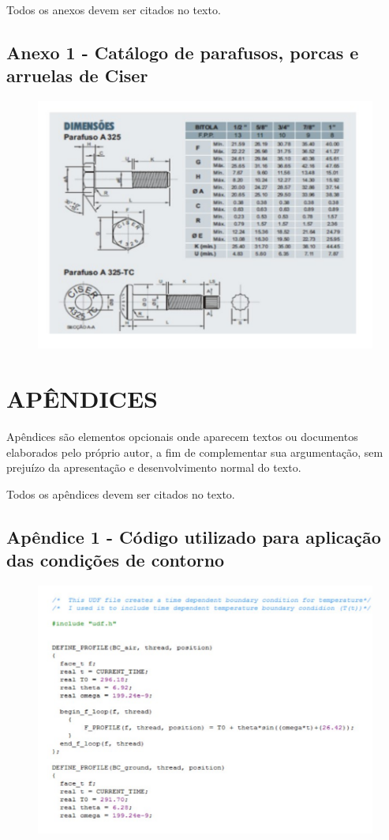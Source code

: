 \documentclass[a4paper,12pt,oneside]{article}
\numberwithin{equation}{section}
\begin{document}
Todos os anexos devem ser citados no texto.


\subsection{Anexo 1 - Catálogo de parafusos, porcas e arruelas de Ciser}
\begin{figure}[h]
\centering
\includegraphics[width=1\linewidth]{img/catalogo}
\end{figure}

\section{APÊNDICES}

Apêndices são elementos opcionais onde aparecem textos ou documentos elaborados pelo próprio autor, a fim de complementar sua argumentação, sem prejuízo da apresentação e
desenvolvimento normal do texto.


Todos os apêndices devem ser citados no texto.


\subsection{Apêndice 1 - Código utilizado para aplicação das condições de contorno}

\begin{figure}[h]
\centering
\includegraphics[width=1\linewidth]{img/codigo}
\end{figure}
\end{document}
